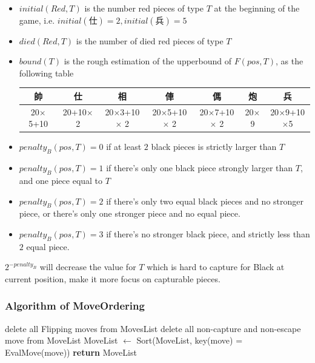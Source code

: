 \documentclass[a4paper, 12pt]{article}  %
\begin{document}
\begin{itemize}
  \item $initial(Red, T)$ is the number red pieces of type $T$ at the beginning of the game, i.e. $initial(\text{仕})=2, initial(\text{兵})=5$
  \item $died(Red, T)$ is the number of died red pieces of type $T$
  \item $bound(T)$ is the rough estimation of the upperbound of $F(pos, T)$, as the following table
  \begin{table}[!h]
    \begin{tabular}{|c|c|c|c|c|c|c|}
        帥 & 仕 & 相 & 俥 & 傌 & 炮 & 兵 \\
        \hline
        20$\times$5+10 &
        20+10$\times$ 2 &
        20$\times$3+10$\times$ 2 &
        20$\times$5+10$\times$ 2 &
        20$\times$7+10$\times$ 2 &
        20$\times$9 &
        20$\times$9+10$\times$5
    \end{tabular}
  \end{table}
  \item $penalty_B(pos, T) = 0$ if at least $2$ black pieces is strictly larger than $T$\\
  \item $penalty_B(pos, T) = 1$ if there's only one black piece strongly larger than $T$, and one piece equal to $T$\\
  \item $penalty_B(pos, T) = 2$ if there's only two equal black pieces and no stronger piece, or there's only one stronger piece and no equal piece.
  \item $penalty_B(pos, T) = 3$ if there's no stronger black piece, and strictly less than $2$ equal piece.
\end{itemize}

$2^{-penalty_B}$ will decrease the value for $T$ which is hard to capture for Black at current position, make it more focus on capturable pieces.

\subsubsection{Algorithm of MoveOrdering}
\begin{algorithm}
  \begin{algorithmic}
      \State delete all Flipping moves from MovesList
    \EndIf
      \State delete all non-capture and non-escape move from MoveList
    \EndIf
    \State MoveList $\gets$ Sort(MoveList, key(move) = EvalMove(move))
    \State \textbf{return} MoveList
    \EndProcedure
  \end{algorithmic}
\end{algorithm}
\end{document}
